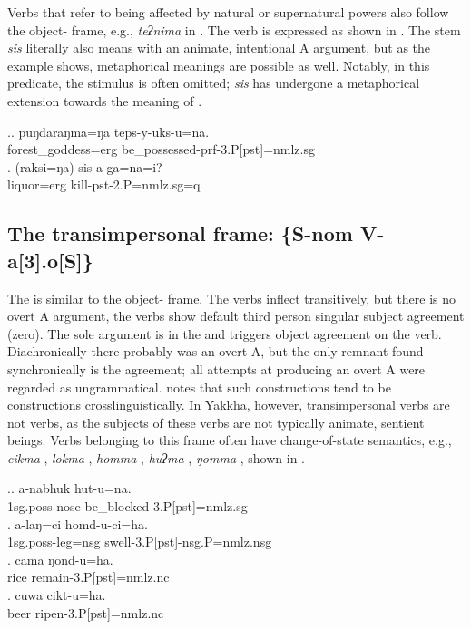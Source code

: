 	
Verbs that refer to being affected by natural or supernatural powers also follow the object- frame, e.g., \emph{teʔnima}  in  \Next[a].  The verb  is expressed as shown in \Next[b]. The stem \emph{sis} literally also means  with an animate, intentional A argument, but as the example shows, metaphorical meanings are possible as well. Notably, in this predicate, the stimulus is often omitted; \emph{sis} has undergone a metaphorical extension towards the meaning of .

\ex.\ag. puŋdaraŋma=ŋa  teps-y-uks-u=na.\\
forest\_goddess{\sc =erg} be\_possessed{\sc -prf-3.P[pst]=nmlz.sg}\\
\bg. (raksi=ŋa)  sis-a-ga=na=i?\\
		liquor{\sc =erg} kill{\sc -pst-2.P=nmlz.sg=q}\\


 
\subsection[The transimpersonal frame]{The transimpersonal frame: \{S-{\sc nom} V-a[3].o[S]\}}\label{tr-imp}


\noindent
The   is similar to the object- frame. The verbs inflect transitively, but there is no overt A argument, the verbs show default third person singular subject agreement (zero). The sole argument is in the  and triggers  object agreement on the verb. Diachronically there probably was  an overt A, but the only remnant found synchronically is the agreement; all attempts at producing an overt A were regarded as ungrammatical. \citet{Malchukov2008Split} notes that such constructions tend to be  constructions crosslinguistically. In Yakkha, however, transimpersonal verbs are not  verbs, as the subjects of these verbs are not typically animate, sentient beings. Verbs belonging to this frame often have change-of-state semantics, e.g., \emph{cikma} , \emph{lokma} , \emph{homma} , \emph{huʔma} , \emph{ŋomma} , shown in \Next. 
 
\ex.\ag. a-nabhuk hut-u=na.\\
 {\sc 1sg.poss-}nose be\_blocked{\sc -3.P[pst]=nmlz.sg} \\
\bg. a-laŋ=ci homd-u-ci=ha.\\
 {\sc 1sg.poss-}leg{\sc =nsg} swell{\sc -3.P[pst]-nsg.P=nmlz.nsg} \\
 \bg. cama ŋond-u=ha.\\
rice remain{\sc -3.P[pst]=nmlz.nc}\\
\bg. cuwa cikt-u=ha.\\
beer ripen{\sc -3.P[pst]=nmlz.nc}\\
 
